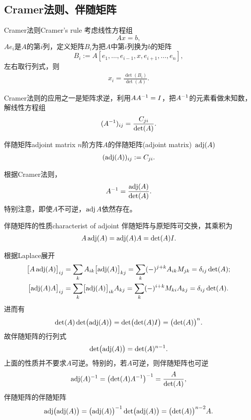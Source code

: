\subsection{Cramer法则、伴随矩阵}
\begin{theorem}{Cramer法则}{Cramer's rule}
	考虑线性方程组
	\[
		Ax=b,
	\]
	$Ae_i$是$A$的第$i$列，定义矩阵$B_i$为把$A$中第$i$列换为$b$的矩阵 
	\[
		B_i:=A[e_1,\ldots,e_{i-1},x,e_{i+1},\ldots,e_n],
	\]
	左右取行列式，则
	\begin{align}
		x_i=\frac{\det(B_i)}{\det(A)}.
	\end{align}
\end{theorem}
Cramer法则的应用之一是矩阵求逆，利用$AA^{-1}=I$，把$A^{-1}$的元素看做未知数，解线性方程组
\[
	(A^{-1})_{ij}=\frac{C_{ji}}{\det(A)}.
\]
\begin{definition}{伴随矩阵}{adjoint matrix}
	$n$阶方阵$A$的伴随矩阵(adjoint matrix)~$\operatorname{adj}(A)$
	\begin{align}
		(\operatorname{adj}(A))_{ij}:=C_{ji}.
	\end{align}
\end{definition}
根据Cramer法则，
\begin{align}
	A^{-1}=\frac{\operatorname{adj}(A)}{\det(A)}.
\end{align}
特别注意，即使$A$不可逆，$\operatorname{adj} A$依然存在。
\begin{theorem}{伴随矩阵的性质}{characterist of adjoint}
	伴随矩阵与原矩阵可交换，其乘积为
	\begin{align}
		A\operatorname{adj}(A)=\operatorname{adj}(A)A=\det(A)I.
	\end{align}
\end{theorem}
\prf 根据Laplace展开
\begin{align*}
	\bigfkh{A\adj(A)}_{ij}&=\sum_{k}A_{ik}\bigfkh{\adj(A)}_{kj}=\sum_{k}(-)^{j+k}A_{ik}M_{jk}=\vd_{ij}\det(A);\\
	\bigfkh{\adj(A)A}_{ij}&=\sum_{k}\bigfkh{\adj(A)}_{ik}A_{kj}=\sum_{k}(-)^{i+k}M_{ki}A_{kj}=\vd_{ij}\det(A).%
\end{align*}
进而有
\[
	\det(A)\det\bigl(\operatorname{adj}(A)\bigr)=\det\bigl(\det(A)I\bigr)=\bigl(\det(A)\bigr)^n.
\]
故伴随矩阵的行列式
\begin{align}
	\det\bigl(\operatorname{adj}(A)\bigr)=\det(A)^{n-1}.
\end{align}
上面的性质并不要求$A$可逆。特别的，若$A$可逆，则伴随矩阵也可逆
\begin{align}
	\operatorname{adj}(A)^{-1}=\bigl(\det(A)A^{-1}\bigr)^{-1}=\frac{A}{\det(A)},
\end{align}
伴随矩阵的伴随矩阵
\begin{align}
	\operatorname{adj}\bigl(\operatorname{adj}(A)\bigr)=\bigl(\operatorname{adj}(A)\bigr)^{-1}\det\bigl(\operatorname{adj}(A)\bigr)=\bigl(\det(A)\bigr)^{n-2}A.
\end{align}


